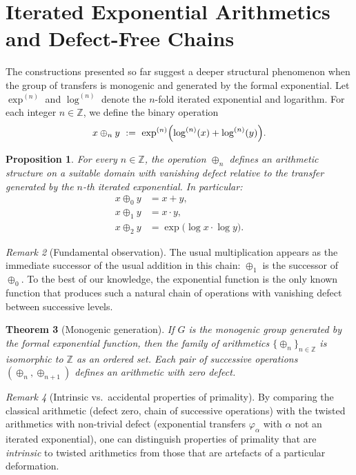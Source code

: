 \documentclass[11pt,a4paper]{article}
\theoremstyle{plain}
\newtheorem{theorem}{Theorem}[section]
\newtheorem{proposition}[theorem]{Proposition}
\theoremstyle{definition}
\theoremstyle{remark}
\newtheorem{remark}[theorem]{Remark}
\newcommand{\ZZ}{\mathbb{Z}}
\begin{document}
	\section{Iterated Exponential Arithmetics and Defect-Free Chains}
	\label{sec:hierarchy}
	The constructions presented so far suggest a deeper structural phenomenon when the group of transfers is monogenic and generated by the formal exponential. Let $\exp^{(n)}$ and $\log^{(n)}$ denote the $n$-fold iterated exponential and logarithm. For each integer $n \in \ZZ$, we define the binary operation
	\[
	x \oplus_n y \ := \ \exp^{(n)} \Bigl( \log^{(n)}(x) + \log^{(n)}(y) \Bigr).
	\]
	
	\begin{proposition}
		For every $n \in \ZZ$, the operation $\oplus_n$ defines an arithmetic structure on a suitable domain with vanishing defect relative to the transfer generated by the $n$-th iterated exponential. In particular:
		\begin{align*}
			x \oplus_0 y &= x + y, \\
			x \oplus_1 y &= x \cdot y, \\
			x \oplus_2 y &= \exp\bigl( \log x \cdot \log y \bigr).
		\end{align*}
	\end{proposition}
	
	\begin{remark}[Fundamental observation]
		The usual multiplication appears as the immediate successor of the usual addition in this chain: $\oplus_1$ is the successor of $\oplus_0$. To the best of our knowledge, the exponential function is the only known function that produces such a natural chain of operations with vanishing defect between successive levels.
	\end{remark}
	
	\begin{theorem}[Monogenic generation]
		\label{thm:monogenic}
		If $G$ is the monogenic group generated by the formal exponential function, then the family of arithmetics $\{\oplus_n\}_{n\in\ZZ}$ is isomorphic to $\ZZ$ as an ordered set. Each pair of successive operations $(\oplus_n, \oplus_{n+1})$ defines an arithmetic with zero defect.
	\end{theorem}
	
	\begin{remark}[Intrinsic vs.\ accidental properties of primality]
		By comparing the classical arithmetic (defect zero, chain of successive operations) with the twisted arithmetics with non-trivial defect (exponential transfers $\varphi_\alpha$ with $\alpha$ not an iterated exponential), one can distinguish properties of primality that are \emph{intrinsic} to twisted arithmetics from those that are artefacts of a particular deformation.
	\end{remark}
	
\end{document}
